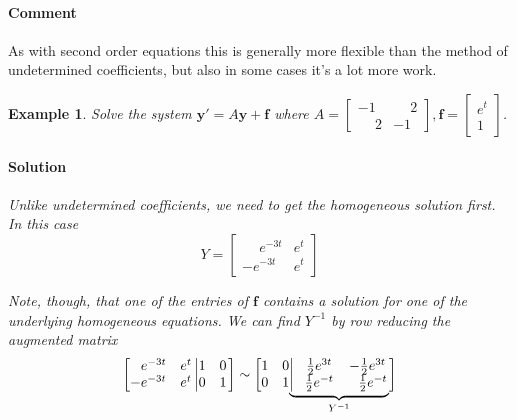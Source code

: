 \documentclass[letterpaper, 11pt, openany]{book}
\theoremstyle{mytheoremstyle}
\theoremstyle{myexamplestyle}
\newtheorem{example}{Example}[section]
\newenvironment{solution}{\paragraph{\sffamily \smaller \fontseries{b}\selectfont Solution}}{\hfill\faSquare}
\newenvironment{commentary}{\paragraph{\sffamily \smaller \fontseries{b}\selectfont Comment}}{}
\begin{document}
\begin{commentary}
    As with second order equations this is generally more flexible than the method of undetermined coefficients, but also in some cases it's a lot more work.
\end{commentary}
\begin{example}
    Solve the system \(\mathbf{y}' =A\mathbf{y} + \mathbf{f}\) where \(A = \begin{bmatrix}
        -1 &   \phantom{-}2\\  \phantom{-}2 & -1
    \end{bmatrix},\mathbf{f} = \begin{bmatrix} e^{t} \\ 1\end{bmatrix}\).
    \begin{solution}
        Unlike undetermined coefficients, we need to get the homogeneous solution first. In this case 
        \[Y = \begin{bmatrix}
             \phantom{-}e^{-3t} & e^{t}\\
            -e^{-3t} & e^{t}
        \end{bmatrix}\] 
        
        Note, though, that one of the entries of \(\mathbf{f}\) contains a solution for one of the underlying homogeneous equations. We can find \(Y^{-1}\) by row reducing the augmented matrix
        {\[\left[\begin{matrix}
            \phantom{-}e^{-3t} & e^{t}\\
            -e^{-3t} & e^{t}
        \end{matrix}
        \left|
            \begin{matrix}
                1 & 0\\ 0 & 1
            \end{matrix}
        \right.
        \right] \sim
        \left[
            \begin{matrix}
                1 & 0\\ 0 & 1
            \end{matrix}
            \smash{\underbrace{
                \left|
                \begin{matrix}
                     \phantom{-}\frac{1}{2}e^{3t} & -\frac{1}{2} e^{3t}\\
                     \phantom{-}\frac{1}{2} e^{-t} &  \phantom{-}\frac{1}{2}e^{-t}
                \end{matrix}
            \right.}_{Y^{-1}}}
        \right] \]}
        \vspace{.25in}
        

\end{solution}
\end{example}
\end{document}

